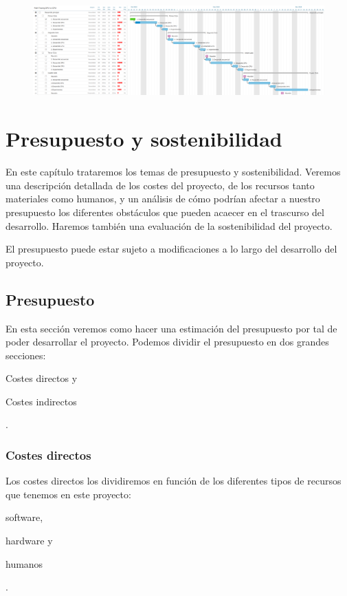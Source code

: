 \documentclass[titlepage,12pt]{report}
\begin{document}
\begin{figure}[H]
	\centering
  	\includegraphics[scale=1.25]{media/final_gantt_2.png}
  	\label{gantt_2}
\end{figure}

\useportrait

\chapter{Presupuesto y sostenibilidad}

En este capítulo trataremos los temas de presupuesto y sostenibilidad. Veremos una descripción detallada de los costes del proyecto, de los recursos tanto materiales como humanos, y un análisis de cómo podrían afectar a nuestro presupuesto los diferentes obstáculos que pueden acaecer en el trascurso del desarrollo. Haremos también una evaluación de la sostenibilidad del proyecto.

El presupuesto puede estar sujeto a modificaciones a lo largo del desarrollo del proyecto.

\section{Presupuesto}

En esta sección veremos como hacer una estimación del presupuesto por tal de poder desarrollar el proyecto. Podemos dividir el presupuesto en dos grandes secciones: \begin{enumerate*}[label=\roman*)] \item Costes directos y \item Costes indirectos
\end{enumerate*}.

\subsection{Costes directos}

Los costes directos los dividiremos en función de los diferentes tipos de recursos que tenemos en este proyecto: \begin{enumerate*}[label=\roman*)] \item software, \item hardware y \item humanos \end{enumerate*}.
\end{document}

